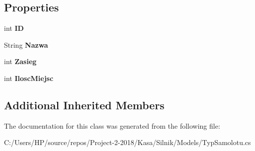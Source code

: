 \subsection*{Properties}
\begin{DoxyCompactItemize}
\item 
\mbox{\label{class_silnik_1_1_models_1_1_typ_samolotu_a5160d3cdf6437ec96ba58ffc8260667d}} 
int {\bfseries ID}
\item 
\mbox{\label{class_silnik_1_1_models_1_1_typ_samolotu_af60ab3d7f97de2fa381b5fe94a4aa47f}} 
String {\bfseries Nazwa}
\item 
\mbox{\label{class_silnik_1_1_models_1_1_typ_samolotu_acbc91ae63d77cd7392e0a51fe3b30ad1}} 
int {\bfseries Zasieg}
\item 
\mbox{\label{class_silnik_1_1_models_1_1_typ_samolotu_a1ff235a7c42697804e2266831e4ee0e7}} 
int {\bfseries Ilosc\+Miejsc}
\end{DoxyCompactItemize}
\subsection*{Additional Inherited Members}


The documentation for this class was generated from the following file\+:\begin{DoxyCompactItemize}
\item 
C\+:/\+Users/\+H\+P/source/repos/\+Project-\/2-\/2018/\+Kasa/\+Silnik/\+Models/Typ\+Samolotu.\+cs\end{DoxyCompactItemize}
